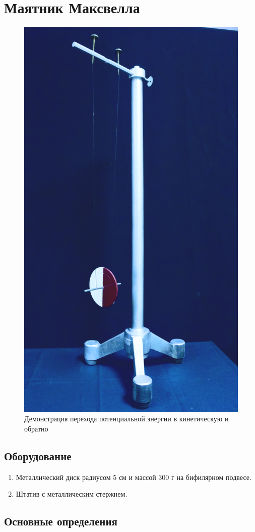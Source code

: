 \documentclass[All.tex]{subfiles}
\begin{document}
	
	
		\section{Маятник Максвелла}


\begin{figure}[H] 	
	\centering 	
	\includegraphics[width=0.4\linewidth]{Maxwell-1.png}
	\caption{Демонстрация перехода потенциальной энергии в кинетическую и обратно}
	\label{Maxwell-1}
\end{figure}

\subsection*{\textcolor{PineGreen}{Оборудование}}
\begin{enumerate}
	\item Металлический диск радиусом 5 см и массой 300 г на бифилярном подвесе.
	\item Штатив с металлическим стержнем.
\end{enumerate}
	
\subsection*{\textcolor{PineGreen}{Основные определения}}
		
\end{document}
